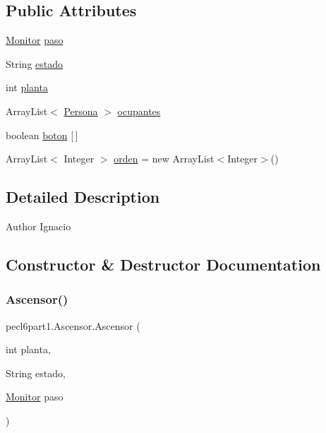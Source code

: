 \subsection*{Public Attributes}
\begin{DoxyCompactItemize}
\item 
\mbox{\hyperlink{classpecl6part1_1_1_monitor}{Monitor}} \mbox{\hyperlink{classpecl6part1_1_1_ascensor_ae7416511a25816c86095a3f91915af06}{paso}}
\item 
String \mbox{\hyperlink{classpecl6part1_1_1_ascensor_ad892045a12a5bfbd5b352fede74a1d0f}{estado}}
\item 
int \mbox{\hyperlink{classpecl6part1_1_1_ascensor_a580b836287ba07c6658c03a5e35fbbdb}{planta}}
\item 
Array\+List$<$ \mbox{\hyperlink{classpecl6part1_1_1_persona}{Persona}} $>$ \mbox{\hyperlink{classpecl6part1_1_1_ascensor_aabf71a3bf26b3bff458534e518835c71}{ocupantes}}
\item 
boolean \mbox{\hyperlink{classpecl6part1_1_1_ascensor_a776f98d552b3308c91b998534f1babc0}{boton}} \mbox{[}$\,$\mbox{]}
\item 
Array\+List$<$ Integer $>$ \mbox{\hyperlink{classpecl6part1_1_1_ascensor_adbe3c1b625d285b4b5011ef0235f3c9f}{orden}} = new Array\+List$<$Integer$>$()
\end{DoxyCompactItemize}


\subsection{Detailed Description}
\begin{DoxyAuthor}{Author}
Ignacio 
\end{DoxyAuthor}


\subsection{Constructor \& Destructor Documentation}
\mbox{\label{classpecl6part1_1_1_ascensor_ac18cbef896a8d2d61e6194e13e37b987}} 
\subsubsection{\texorpdfstring{Ascensor()}{Ascensor()}}
{\footnotesize\ttfamily pecl6part1.\+Ascensor.\+Ascensor (\begin{DoxyParamCaption}\item[{int}]{planta,  }\item[{String}]{estado,  }\item[{\mbox{\hyperlink{classpecl6part1_1_1_monitor}{Monitor}}}]{paso }\end{DoxyParamCaption})\hspace{0.3cm}{\ttfamily [inline]}}


